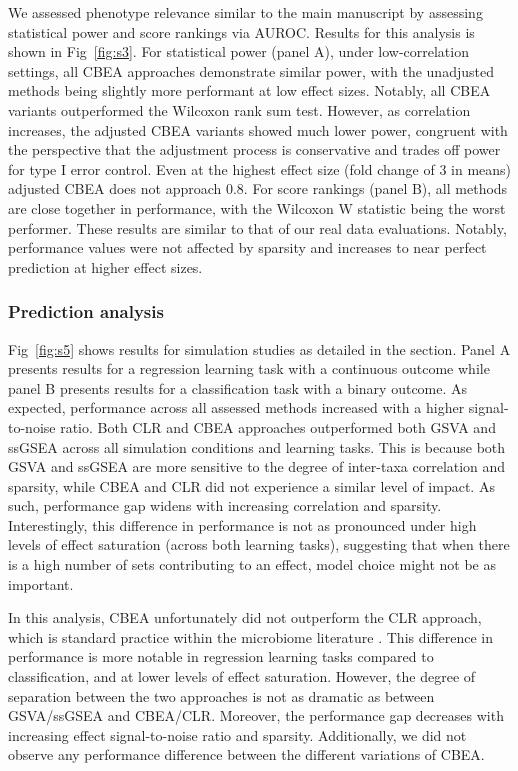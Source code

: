 \documentclass{article}
\begin{document}
We assessed phenotype relevance similar to the main manuscript by assessing statistical power and score rankings via AUROC. Results for this analysis is shown in Fig~\ref{fig:s3}. For statistical power (panel A), under low-correlation settings, all CBEA approaches demonstrate similar power, with the unadjusted methods being slightly more performant at low effect sizes. Notably, all CBEA variants outperformed the Wilcoxon rank sum test. However, as correlation increases, the adjusted CBEA variants showed much lower power, congruent with the perspective that the adjustment process is conservative and trades off power for type I error control. Even at the highest effect size (fold change of 3 in means) adjusted CBEA does not approach 0.8. For score rankings (panel B), all methods are close together in performance, with the Wilcoxon W statistic being the worst performer. These results are similar to that of our real data evaluations. Notably, performance values were not affected by sparsity and increases to near perfect prediction at higher effect sizes.  

\subsubsection{Prediction analysis}
Fig~\ref{fig:s5} shows results for simulation studies as detailed in the  section. Panel A presents results for a regression learning task with a continuous outcome while panel B presents results for a classification task with a binary outcome. As expected, performance across all assessed methods increased with a higher signal-to-noise ratio. Both CLR and CBEA approaches outperformed both GSVA and ssGSEA across all simulation conditions and learning tasks. This is because both GSVA and ssGSEA are more sensitive to the degree of inter-taxa correlation and sparsity, while CBEA and CLR did not experience a similar level of impact. As such, performance gap widens with increasing correlation and sparsity. Interestingly, this difference in performance is not as pronounced under high levels of effect saturation (across both learning tasks), suggesting that when there is a high number of sets contributing to an effect, model choice might not be as important.   

In this analysis, CBEA unfortunately did not outperform the CLR approach, which is standard practice within the microbiome literature \cite{gloor2017}. This difference in performance is more notable in regression learning tasks compared to classification, and at lower levels of effect saturation. However, the degree of separation between the two approaches is not as dramatic as between GSVA/ssGSEA and CBEA/CLR. Moreover, the performance gap decreases with increasing effect signal-to-noise ratio and sparsity. Additionally, we did not observe any performance difference between the different variations of CBEA. 
\end{document}
